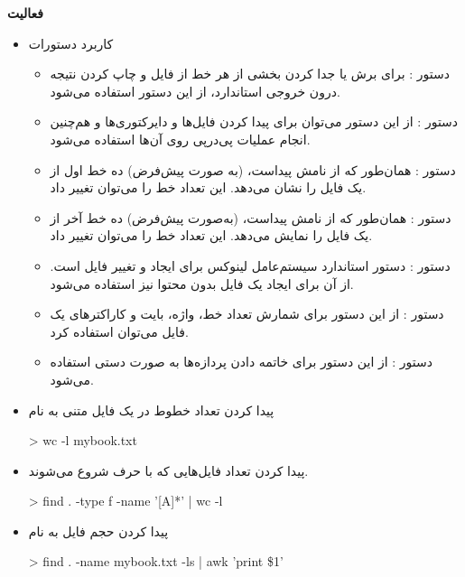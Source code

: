 \textbf{فعالیت}
\begin{itemize}
	\item 
		کاربرد دستورات
		
		\begin{itemize}
			\item دستور : برای برش یا جدا کردن بخشی از هر خط از فایل و چاپ کردن نتیجه درون خروجی استاندارد، از این دستور استفاده می‌شود.
			\item دستور :
			از این دستور می‌توان برای پیدا کردن فایل‌ها و دایرکتوری‌ها و هم‌چنین انجام عملیات پی‌در‌پی روی آن‌ها استفاده می‌شود.
			\item دستور :
			همان‌طور که از نامش پیداست، (به صورت پیش‌فرض) ده خط اول از یک فایل را نشان می‌دهد. این تعداد خط را می‌توان تغییر داد.
			\item دستور :
			همان‌طور که از نامش پیداست، (به‌صورت پیش‌فرض) ده خط آخر از یک فایل را نمایش می‌دهد. این تعداد خط را می‌توان تغییر داد.
			\item دستور :
			دستور استاندارد سیستم‌عامل لینوکس برای ایجاد و تغییر  فایل است. از آن برای ایجاد یک فایل بدون محتوا نیز استفاده می‌شود.
			
			\item دستور :
			از این دستور برای شمارش تعداد خط، واژه، بایت و کاراکترهای یک فایل می‌توان استفاده کرد.
			
			\item دستور :
			از این دستور برای خاتمه دادن پردازه‌ها به صورت دستی استفاده می‌شود.
		\end{itemize}
	\item پیدا کردن تعداد خطوط در یک فایل متنی به نام 
	
	\begin{code}
		> wc -l mybook.txt
	\end{code}

	\item پیدا کردن تعداد فایل‌هایی که با حرف  شروع می‌شوند.
	\begin{code}
		> find . -type f -name '[A]*' | wc -l
	\end{code}
	\item پیدا کردن حجم فایل به نام 
	
	\begin{code}
		> find . -name mybook.txt  -ls | awk '{print \$1}' 
	\end{code}
\end{itemize}

\newpage

